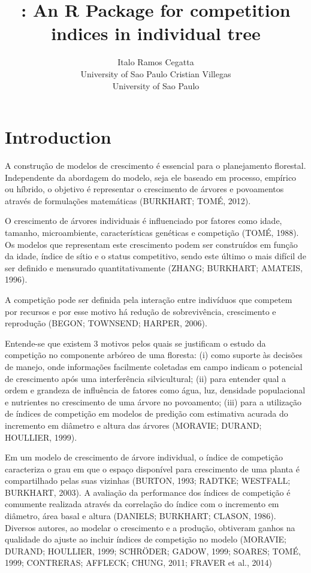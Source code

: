 \documentclass[article]{jss}
\author{
Italo Ramos Cegatta\\University of Sao Paulo \And Cristian Villegas\\University of Sao Paulo
}
\title{\pkg{comp3}: An R Package for competition indices in individual tree}
\begin{document}
\section{Introduction}\label{introduction}

A construção de modelos de crescimento é essencial para o planejamento
florestal. Independente da abordagem do modelo, seja ele baseado em
processo, empírico ou híbrido, o objetivo é representar o crescimento de
árvores e povoamentos através de formulações matemáticas (BURKHART;
TOMÉ, 2012).

O crescimento de árvores individuais é influenciado por fatores como
idade, tamanho, microambiente, características genéticas e competição
(TOMÉ, 1988). Os modelos que representam este crescimento podem ser
construídos em função da idade, índice de sítio e o status competitivo,
sendo este último o mais difícil de ser definido e mensurado
quantitativamente (ZHANG; BURKHART; AMATEIS, 1996).

A competição pode ser definida pela interação entre indivíduos que
competem por recursos e por esse motivo há redução de sobrevivência,
crescimento e reprodução (BEGON; TOWNSEND; HARPER, 2006).

Entende-se que existem 3 motivos pelos quais se justificam o estudo da
competição no componente arbóreo de uma floresta: (i) como suporte às
decisões de manejo, onde informações facilmente coletadas em campo
indicam o potencial de crescimento após uma interferência silvicultural;
(ii) para entender qual a ordem e grandeza de influência de fatores como
água, luz, densidade populacional e nutrientes no crescimento de uma
árvore no povoamento; (iii) para a utilização de índices de competição
em modelos de predição com estimativa acurada do incremento em diâmetro
e altura das árvores (MORAVIE; DURAND; HOULLIER, 1999).

Em um modelo de crescimento de árvore individual, o índice de competição
caracteriza o grau em que o espaço disponível para crescimento de uma
planta é compartilhado pelas suas vizinhas (BURTON, 1993; RADTKE;
WESTFALL; BURKHART, 2003). A avaliação da performance dos índices de
competição é comumente realizada através da correlação do índice com o
incremento em diâmetro, área basal e altura (DANIELS; BURKHART; CLASON,
1986). Diversos autores, ao modelar o crescimento e a produção,
obtiveram ganhos na qualidade do ajuste ao incluir índices de competição
no modelo (MORAVIE; DURAND; HOULLIER, 1999; SCHRÖDER; GADOW, 1999;
SOARES; TOMÉ, 1999; CONTRERAS; AFFLECK; CHUNG, 2011; FRAVER et al.,
2014)
\end{document}
